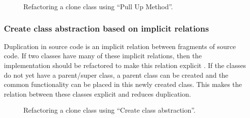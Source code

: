 \begin{figure}[H]
\begin{parcolumns}{2}
\end{parcolumns}
\caption{Refactoring a clone class using ``Pull Up Method''.}
\label{fig:pullupmethod}
\end{figure}

\subsubsection{Create class abstraction based on implicit relations}
Duplication in source code is an implicit relation between fragments of source code. If two classes have many of these implicit relations, then the implementation should be refactored to make this relation explicit \cite{fowler2018refactoring}. If the classes do not yet have a parent/super class, a parent class can be created and the common functionality can be placed in this newly created class. This makes the relation between these classes explicit and reduces duplication.

\begin{figure}[H]
\begin{parcolumns}{2}
\end{parcolumns}
\caption{Refactoring a clone class using ``Create class abstraction''.}
\label{fig:createclassabstraction}
\end{figure}

